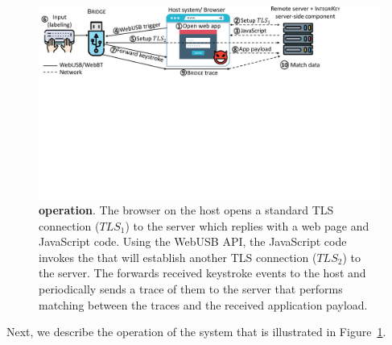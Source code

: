 %
%
\begin{figure}[t]
 \centering
  \includegraphics[trim={0 11cm 4cm 0},clip,width=\linewidth]{chapters/IntegriKey/images/SystemDesign_forms.pdf} 
 \caption[\name operation]{\textbf{\name operation}. The browser on the host opens a standard TLS connection ($TLS_1$) to the server which replies with a web page and JavaScript code. Using the WebUSB API, the JavaScript code invokes the \device that will establish another TLS connection ($TLS_2$) to the server. The \device forwards received keystroke events to the host and periodically sends a trace of them to the server that performs matching between the traces and the received application payload.}
 \label{fig:systemDesignForms}
\end{figure}

Next, we describe the operation of the \name system that is illustrated in Figure~\ref{fig:systemDesignForms}. 


